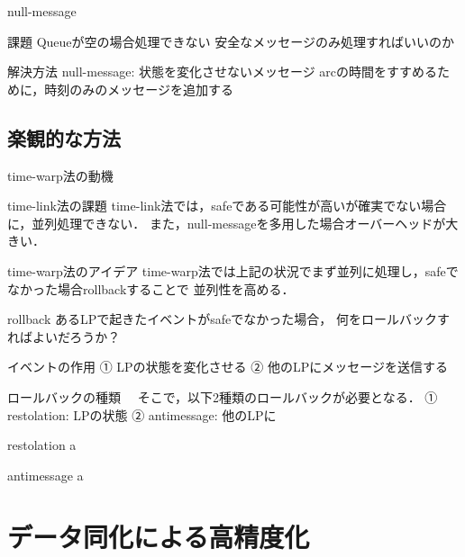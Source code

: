 \documentclass[dvipdfmx,uplatex,11pt]{beamer}
\theoremstyle{definition}
\begin{document}
\begin{frame}{null-message}
  \begin{block}{課題}
   Queueが空の場合処理できない
  安全なメッセージのみ処理すればいいのか
  \end{block}
  \begin{block}{解決方法}
  null-message: 状態を変化させないメッセージ
  arcの時間をすすめるために，時刻のみのメッセージを追加する
  \end{block}
\end{frame}

\subsection{楽観的な方法}
\begin{frame}{time-warp法の動機}
  \begin{block}{time-link法の課題}
  time-link法では，safeである可能性が高いが確実でない場合に，並列処理できない．
  また，null-messageを多用した場合オーバーヘッドが大きい．
  \end{block}
  \begin{block}{time-warp法のアイデア}
  time-warp法では上記の状況でまず並列に処理し，safeでなかった場合rollbackすることで
  並列性を高める．
  \end{block}
\end{frame}

\begin{frame}{rollback}
  あるLPで起きたイベントがsafeでなかった場合，
  何をロールバックすればよいだろうか？
  \begin{block}{イベントの作用}
  ① LPの状態を変化させる
  ② 他のLPにメッセージを送信する
  \end{block}
  \begin{block}{ロールバックの種類}
　そこで，以下2種類のロールバックが必要となる．
  ①  restolation:  LPの状態
  ②  antimessage:  他のLPに
  \end{block}
\end{frame}

\begin{frame}{restolation}
  a
\end{frame}

\begin{frame}{antimessage}
  a
\end{frame}

\section{データ同化による高精度化}
\end{document}
